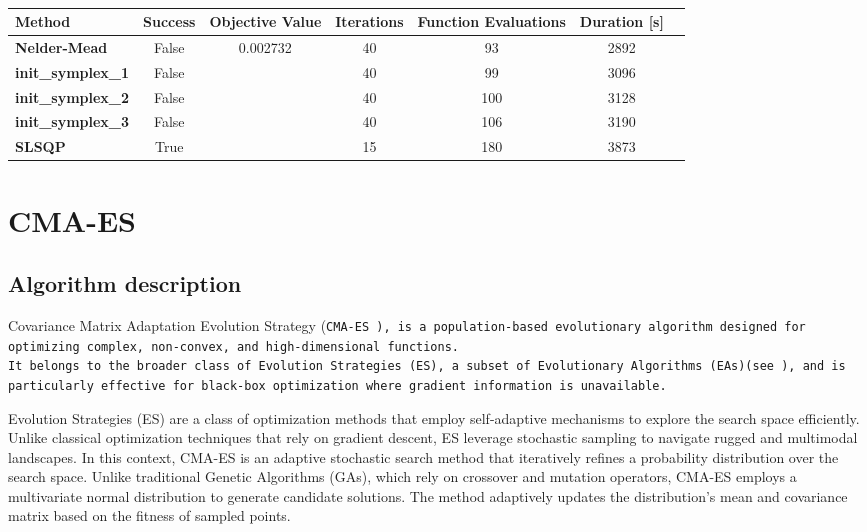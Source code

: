 \begin{table}[h]
    \centering
    \begin{tabular}{lcccccc}
        \toprule
        \textbf{Method} & \textbf{Success} & \textbf{Objective Value} & \textbf{Iterations} & \textbf{Function Evaluations} & \textbf{Duration [s]}\\
        \hline
        \textbf{Nelder-Mead} & False & 0.002732 & 40 & 93 & 2892 \\
        \textbf{init\_symplex\_1} & False & & 40 & 99 & 3096\\
        \textbf{init\_symplex\_2} & False & & 40 & 100 & 3128\\
        \textbf{init\_symplex\_3} & False & & 40 & 106 & 3190\\
        \textbf{SLSQP} & True & & 15 & 180 & 3873\\
        \bottomrule
    \end{tabular}
    \caption{}
    \label{tab:scipy_opt}
\end{table}


\section{CMA-ES}

\subsection{Algorithm description}
Covariance Matrix Adaptation Evolution Strategy (\tt{CMA-ES} \cite{cmaessimplepractical}), is a population-based evolutionary algorithm designed for optimizing complex, non-convex, and high-dimensional functions.\\
It belongs to the broader class of Evolution Strategies (ES), a subset of Evolutionary Algorithms (EAs)(see \cite{sloss20192019evolutionaryalgorithmsreview}), and is particularly effective for black-box optimization where gradient information is unavailable.

Evolution Strategies (ES) are a class of optimization methods that employ self-adaptive mechanisms to explore the search space efficiently. 
Unlike classical optimization techniques that rely on gradient descent, ES leverage stochastic sampling to navigate rugged and multimodal landscapes.
In this context, CMA-ES is an adaptive stochastic search method that iteratively refines a probability distribution over the search space. 
Unlike traditional Genetic Algorithms (GAs), which rely on crossover and mutation operators, CMA-ES employs a multivariate normal distribution to generate candidate solutions. 
The method adaptively updates the distribution's mean and covariance matrix based on the fitness of sampled points.

